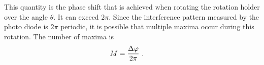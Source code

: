 This quantity is the phase shift that is achieved when rotating the rotation holder over the angle $\theta$. It can exceed $2\pi$. Since the interference pattern measured by the photo diode is $2\pi$ periodic, it is possible that multiple maxima occur during this rotation. The number of maxima is 
\begin{align}
  \label{eq:number_of_maxima}
  M &= \frac{\Delta \varphi}{2\pi} \text{ . }
\end{align}



